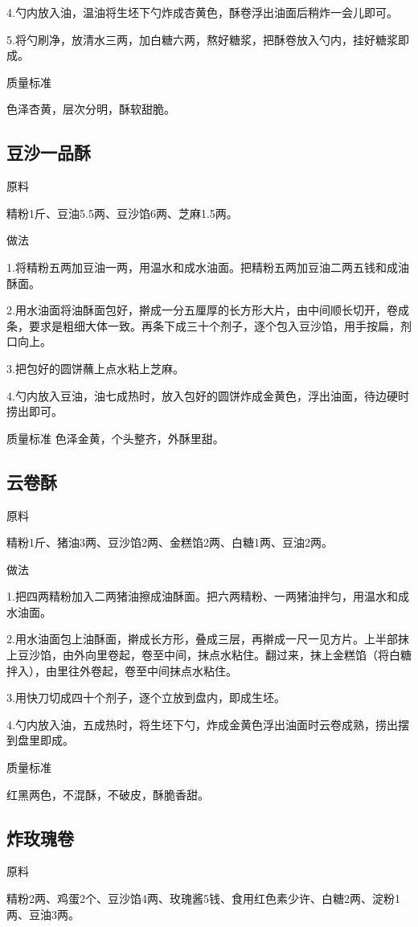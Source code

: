 \documentclass{ctexbook}
\begin{document}
4.勺内放入油，温油将生坯下勺炸成杏黄色，酥卷浮出油面后稍炸一会儿即可。

5.将勺刷净，放清水三两，加白糖六两，熬好糖浆，把酥卷放入勺内，挂好糖浆即成。

质量标准

色泽杏黄，层次分明，酥软甜脆。
\subsection{豆沙一品酥}
原料

精粉1斤、豆油5.5两、豆沙馅6两、芝麻1.5两。

做法

1.将精粉五两加豆油一两，用温水和成水油面。把精粉五两加豆油二两五钱和成油酥面。

2.用水油面将油酥面包好，擀成一分五厘厚的长方形大片，由中间顺长切开，卷成条，要求是粗细大体一致。再条下成三十个剂子，逐个包入豆沙馅，用手按扁，剂口向上。

3.把包好的圆饼蘸上点水粘上芝麻。

4.勺内放入豆油，油七成热时，放入包好的圆饼炸成金黄色，浮出油面，待边硬时捞出即可。

质量标准
色泽金黄，个头整齐，外酥里甜。
\subsection{云卷酥}
原料

精粉1斤、猪油3两、豆沙馅2两、金糕馅2两、白糖1两、豆油2两。

做法

1.把四两精粉加入二两猪油擦成油酥面。把六两精粉、一两猪油拌匀，用温水和成水油面。

2.用水油面包上油酥面，擀成长方形，叠成三层，再擀成一尺一见方片。上半部抹上豆沙馅，由外向里卷起，卷至中间，抹点水粘住。翻过来，抹上金糕馅（将白糖拌入），由里往外卷起，卷至中间抹点水粘住。

3.用快刀切成四十个剂子，逐个立放到盘内，即成生坯。

4.勺内放入油，五成热时，将生坯下勺，炸成金黄色浮出油面时云卷成熟，捞出摆到盘里即成。

质量标准

红黑两色，不混酥，不破皮，酥脆香甜。
\subsection{炸玫瑰卷}
原料

精粉2两、鸡蛋2个、豆沙馅4两、玫瑰酱5钱、食用红色素少许、白糖2两、淀粉1两、豆油3两。
\end{document}
